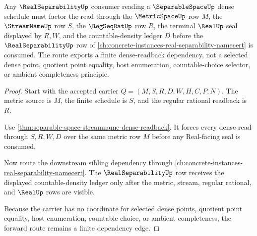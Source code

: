 \begin{theorem}
\label{thm:separable-space-real-separability-forward-route}
Any $\RealSeparabilityUp$ consumer reading a $\SeparableSpaceUp$ dense schedule must factor the read through the $\MetricSpaceUp$ row $M$, the $\StreamNameUp$ row $S$, the $\RegSeqRatUp$ row $R$, the terminal $\RealUp$ seal displayed by $R,W$, and the countable-density ledger $D$ before the $\RealSeparabilityUp$ row of \autoref{ch:concrete-instances-real-separability-namecert} is consumed. The route exports a finite dense-readback dependency, not a selected dense point, quotient point equality, host enumeration, countable-choice selector, or ambient completeness principle.
\end{theorem}
\begin{proof}
Start with the accepted carrier $Q=(M,S,R,D,W,H,C,P,N)$. The metric source is $M$, the finite schedule is $S$, and the regular rational readback is $R$.

Use \autoref{thm:separable-space-streamname-dense-readback}. It forces every dense read through $S,R,W,D$ over the same metric row $M$ before any Real-facing seal is consumed.

Now route the downstream sibling dependency through \autoref{ch:concrete-instances-real-separability-namecert}. The $\RealSeparabilityUp$ row receives the displayed countable-density ledger only after the metric, stream, regular rational, and $\RealUp$ rows are visible.

Because the carrier has no coordinate for selected dense points, quotient point equality, host enumeration, countable choice, or ambient completeness, the forward route remains a finite dependency edge.
\end{proof}
